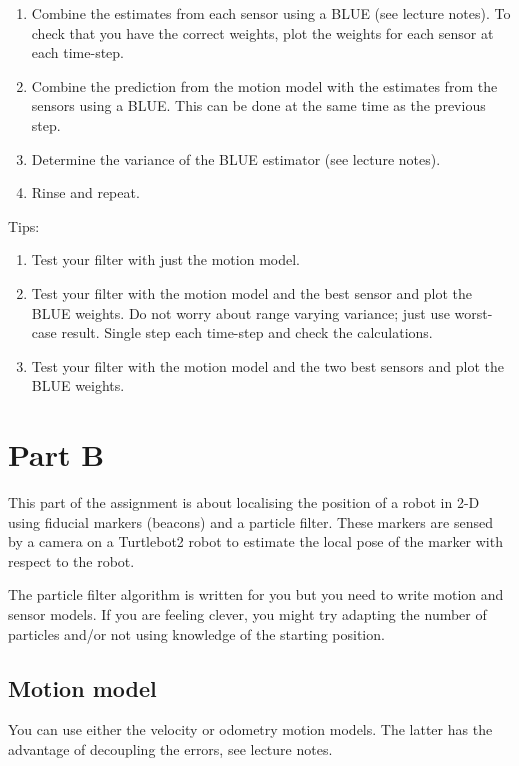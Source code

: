 \documentclass[a4paper, 12pt]{article}
\begin{document}
\begin{enumerate}
\item Combine the estimates from each sensor using a BLUE (see lecture
  notes).  To check that you have the correct weights, plot the
  weights for each sensor at each time-step.

\item Combine the prediction from the motion model with the estimates
  from the sensors using a BLUE.  This can be done at the same time as
  the previous step.

\item Determine the variance of the BLUE estimator (see lecture
  notes).

\item Rinse and repeat.
\end{enumerate}

Tips:
%
\begin{enumerate}
\item Test your filter with just the motion model.

\item Test your filter with the motion model and the best sensor and
  plot the BLUE weights.  Do not worry about range varying variance;
  just use worst-case result.  Single step each time-step and check
  the calculations.

\item Test your filter with the motion model and the two best sensors
  and plot the BLUE weights.
\end{enumerate}


\section{Part B}

This part of the assignment is about localising the position of a
robot in 2-D using fiducial markers (beacons) and a particle filter.
These markers are sensed by a camera on a Turtlebot2 robot to estimate
the local pose of the marker with respect to the robot.


The particle filter algorithm is written for you but you need to write
motion and sensor models.  If you are feeling clever, you might try
adapting the number of particles and/or not using knowledge of the
starting position.


\subsection{Motion model}

You can use either the velocity or odometry motion models.  The latter
has the advantage of decoupling the errors, see lecture notes.
\end{document}
